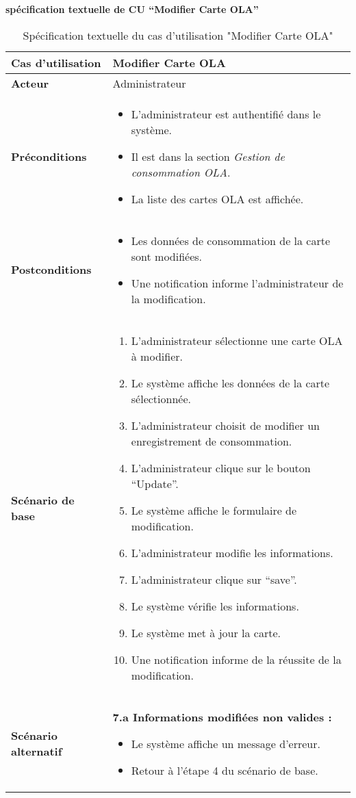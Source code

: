 \documentclass[a4paper,11pt]{report}
\begin{document}
\textbf{spécification textuelle de CU “Modifier Carte OLA”}


\begin{table}[H]
  \centering
  \renewcommand{\arraystretch}{1.5}
  \caption{Spécification textuelle du cas d'utilisation "Modifier Carte OLA"}
  \begin{tabularx}{\textwidth}{|l|X|}
    \hline
    \textbf{Cas d'utilisation} & Modifier Carte OLA \\ \hline
    \textbf{Acteur} & Administrateur \\ \hline
    \textbf{Préconditions} & 
    \begin{itemize}
      \item L’administrateur est authentifié dans le système.
      \item Il est dans la section \textit{Gestion de consommation OLA}.
      \item La liste des cartes OLA est affichée.
    \end{itemize} \\ \hline
    \textbf{Postconditions} & 
    \begin{itemize}
      \item Les données de consommation de la carte sont modifiées.
      \item Une notification informe l’administrateur de la modification.
    \end{itemize} \\ \hline
    \textbf{Scénario de base} & 
    \begin{enumerate}
      \item L’administrateur sélectionne une carte OLA à modifier.
      \item Le système affiche les données de la carte sélectionnée.
      \item L’administrateur choisit de modifier un enregistrement de consommation.
      \item L’administrateur clique sur le bouton “Update”.
      \item Le système affiche le formulaire de modification.
      \item L’administrateur modifie les informations.
      \item L’administrateur clique sur “save”.
      \item Le système vérifie les informations.
      \item Le système met à jour la carte.
      \item Une notification informe de la réussite de la modification.
    \end{enumerate} \\ \hline
    \textbf{Scénario alternatif} & 
    \textbf{7.a Informations modifiées non valides :}
    \begin{itemize}
      \item Le système affiche un message d’erreur.
      \item Retour à l’étape 4 du scénario de base.
    \end{itemize} \\ \hline
  \end{tabularx}
\end{table}
\end{document}
